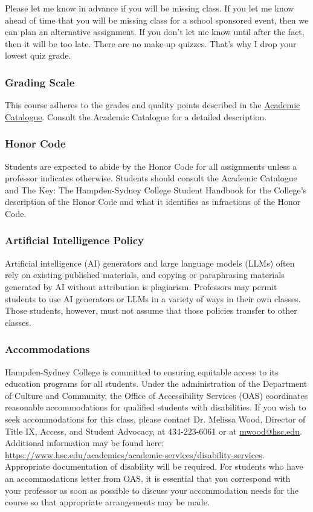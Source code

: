 \documentclass[10pt]{article}
\begin{document}
Please let me know in advance if you will be missing class. If you let me know ahead of time that you will be missing class for a school sponsored event, then we can plan an alternative assignment. If you don't let me know until after the fact, then it will be too late.  There are no make-up quizzes.  That's why I drop your lowest quiz grade. 

\subsubsection*{Grading Scale} 

This course adheres to the grades and quality points described in the \href{https://www.hsc.edu/academic-catalogues}{Academic Catalogue}. Consult the Academic Catalogue for a detailed description. 


\subsubsection*{Honor Code}

Students are expected to abide by the Honor Code for all assignments unless a professor indicates otherwise. Students should consult the Academic Catalogue and The Key: The Hampden-Sydney College Student Handbook for the College’s description of the Honor Code and what it identifies as infractions of the Honor Code.

\subsubsection*{Artificial Intelligence Policy}

Artificial intelligence (AI) generators and large language models (LLMs) often rely on existing published materials, and copying or paraphrasing materials generated by AI without attribution is plagiarism. Professors may permit students to use AI generators or LLMs in a variety of ways in their own classes. Those students, however, must not assume that those policies transfer to other classes.

\subsubsection*{Accommodations}

Hampden-Sydney College is committed to ensuring equitable access to its education programs for all students. Under the administration of the Department of Culture and Community, the Office of Accessibility Services (OAS) coordinates reasonable accommodations for qualified students with disabilities. If you wish to seek accommodations for this class, please contact Dr. Melissa Wood, Director of Title IX, Access, and Student Advocacy, at 434-223-6061 or at \url{mwood@hsc.edu}. Additional information may be found here: \url{https://www.hsc.edu/academics/academic-services/disability-services}. Appropriate documentation of disability will be required. For students who have an accommodations letter from OAS, it is essential that you correspond with your professor as soon as possible to discuss your accommodation needs for the course so that appropriate arrangements may be made. 
\end{document}
